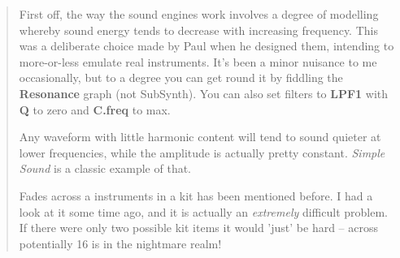   \begin{quotation}
      First off, the way the sound engines work involves a degree of modelling
      whereby sound energy tends to decrease with increasing frequency. This
      was a deliberate choice made by Paul when he designed them, intending to
      more-or-less emulate real instruments. It's been a minor nuisance to me
      occasionally, but to a degree you can get round it by fiddling the
      \textbf{Resonance} graph (not SubSynth).
      You can also set filters to \textbf{LPF1}
      with \textbf{Q} to zero and \textbf{C.freq} to max.

      Any waveform with little harmonic content will tend to sound quieter at
      lower frequencies, while the amplitude is actually pretty constant.
      \textsl{Simple Sound} is a classic example of that.

      Fades across a instruments in a kit has been mentioned before. I had a
      look at it some time ago, and it is actually an
      \textsl{extremely} difficult
      problem. If there were only two possible kit items it would 'just' be
      hard -- across potentially 16 is in the nightmare realm!
   \end{quotation}

